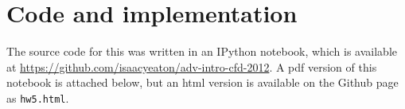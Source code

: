 \documentclass[11pt, letterpaper]{article}
\begin{document}
\clearpage
\section{Code and implementation}

The source code for this was written in an IPython notebook, which
is available at \url{https://github.com/isaacyeaton/adv-intro-cfd-2012}.  A pdf
version of this notebook is attached below, but an html version is available
on the Github page as \texttt{hw5.html}.


\end{document}
